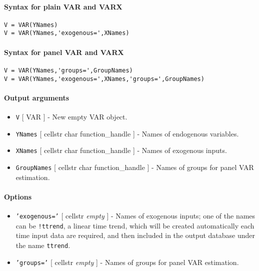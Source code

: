 


	\paragraph{Syntax for plain VAR and
VARX}\label{syntax-for-plain-var-and-varx}

\begin{verbatim}
V = VAR(YNames)
V = VAR(YNames,'exogenous=',XNames)
\end{verbatim}

\paragraph{Syntax for panel VAR and
VARX}\label{syntax-for-panel-var-and-varx}

\begin{verbatim}
V = VAR(YNames,'groups=',GroupNames)
V = VAR(YNames,'exogenous=',XNames,'groups=',GroupNames)
\end{verbatim}

\paragraph{Output arguments}\label{output-arguments}

\begin{itemize}
\item
  \texttt{V} {[} VAR {]} - New empty VAR object.
\item
  \texttt{YNames} {[} cellstr \textbar{} char \textbar{}
  function\_handle {]} - Names of endogenous variables.
\item
  \texttt{XNames} {[} cellstr \textbar{} char \textbar{}
  function\_handle {]} - Names of exogenous inputs.
\item
  \texttt{GroupNames} {[} cellstr \textbar{} char \textbar{}
  function\_handle {]} - Names of groups for panel VAR estimation.
\end{itemize}

\paragraph{Options}\label{options}

\begin{itemize}
\item
  \texttt{'exogenous='} {[} cellstr \textbar{} \emph{empty} {]} - Names
  of exogenous inputs; one of the names can be \texttt{!ttrend}, a
  linear time trend, which will be created automatically each time input
  data are required, and then included in the output database under the
  name \texttt{ttrend}.
\item
  \texttt{'groups='} {[} cellstr \textbar{} \emph{empty} {]} - Names of
  groups for panel VAR estimation.
\end{itemize}

